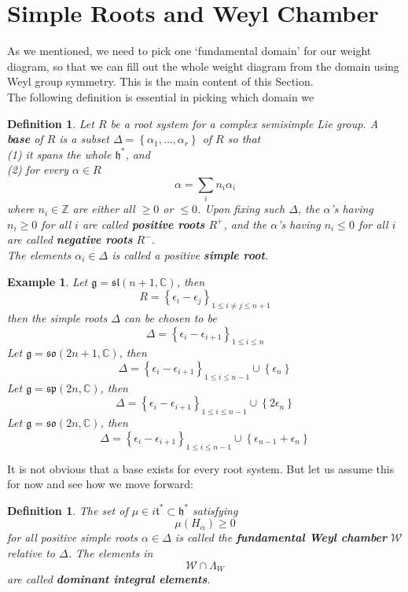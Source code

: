 \documentclass[11pt]{book}
\newtheorem{example}[theorem]{Example}
\newtheorem{definition}[theorem]{Definition}
\newcommand{\bb}[1]{\mathbb{#1}}
\newcommand{\mc}[1]{\mathcal{#1}}
\newcommand{\mf}[1]{\mathfrak{#1}}
\begin{document}
\section{Simple Roots and Weyl Chamber}
As we mentioned, we need to pick one `fundamental domain' for our weight diagram, so that we can fill out the whole weight diagram from the domain using Weyl group symmetry. This is the main content of this Section.\\
The following definition is essential in picking which domain we
\begin{definition}
Let $R$ be a root system for a complex semisimple Lie group. A \textbf{base} of $R$ is a subset $\Delta = \left\{\alpha_1, \dots, \alpha_r\right\}$ of $R$ so that\\
(1) it spans the whole $\mf{h}^*$, and \\
(2) for every $\alpha \in R$
$$\alpha = \sum_i n_i \alpha_i$$
where $n_i \in \bb{Z}$ are either all $\geq 0$ or $\leq 0$.
Upon fixing such $\Delta$, the $\alpha$'s having $n_i \geq 0$ for all $i$ are called \textbf{positive roots} $R^+$, and the $\alpha$'s having $n_i \leq 0$ for all $i$ are called \textbf{negative roots} $R^-$.\\
The elements $\alpha_i \in \Delta$ is called a positive \textbf{simple root}.
\end{definition}
\begin{example}
Let $\mf{g} = \mf{sl}(n+1,\bb{C})$, then
$$R = \left\{ \epsilon_i - \epsilon_j \right\}_{1 \leq i \neq j \leq n+1}$$
then the simple roots $\Delta$ can be chosen to be
$$\Delta = \left\{ \epsilon_i - \epsilon_{i+1} \right\}_{1 \leq i \leq n}$$
Let $\mf{g} = \mf{so}(2n+1,\bb{C})$, then
$$\Delta = \left\{ \epsilon_i - \epsilon_{i+1} \right\}_{1 \leq i \leq n-1} \cup \left\{\epsilon_{n}\right\}$$
Let $\mf{g} = \mf{sp}(2n,\bb{C})$, then
$$\Delta = \left\{ \epsilon_i - \epsilon_{i+1} \right\}_{1 \leq i \leq n-1} \cup \left\{2\epsilon_{n}\right\}$$
Let $\mf{g} = \mf{so}(2n,\bb{C})$, then
$$\Delta = \left\{ \epsilon_i - \epsilon_{i+1} \right\}_{1 \leq i \leq n-1} \cup \left\{\epsilon_{n-1}+ \epsilon_n \right\}$$
\end{example}
It is not obvious that a base exists for every root system. But let us assume this for now and see how we move forward:
\begin{definition}
The set of $\mu \in i\mf{t}^* \subset \mf{h}^*$ satisfying
$$\mu(H_{\alpha}) \geq 0$$
for all positive simple roots $\alpha \in \Delta$ is called the \textbf{fundamental Weyl chamber} $\mc{W}$ relative to $\Delta$. The elements in
$$\mc{W} \cap \Lambda_W$$
are called \textbf{dominant integral elements}.
\end{definition}
\end{document}

